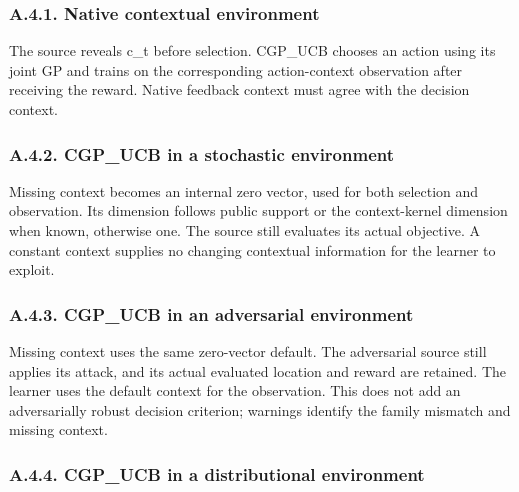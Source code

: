 \documentclass[10pt,a4paper]{article}
\begin{document}
\subsubsection*{A.4.1. Native contextual environment}

The source reveals c\_\allowbreak{}t before selection. CGP\_\allowbreak{}UCB chooses an action using its joint GP and trains on the corresponding action-context observation after receiving the reward. Native feedback context must agree with the decision context.


\subsubsection*{A.4.2. CGP\_\allowbreak{}UCB in a stochastic environment}

Missing context becomes an internal zero vector,\allowbreak{} used for both selection and observation. Its dimension follows public support or the context-kernel dimension when known,\allowbreak{} otherwise one. The source still evaluates its actual objective. A constant context supplies no changing contextual information for the learner to exploit.


\subsubsection*{A.4.3. CGP\_\allowbreak{}UCB in an adversarial environment}

Missing context uses the same zero-vector default. The adversarial source still applies its attack,\allowbreak{} and its actual evaluated location and reward are retained. The learner uses the default context for the observation. This does not add an adversarially robust decision criterion; warnings identify the family mismatch and missing context.


\subsubsection*{A.4.4. CGP\_\allowbreak{}UCB in a distributional environment}
\end{document}
